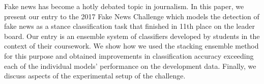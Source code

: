 Fake news has become a hotly debated topic in journalism. In this paper, we present our entry to the 2017 Fake News Challenge which models the detection of fake news as a stance classification task that finished in 11th place on the leader board. Our entry is an ensemble system of classifiers developed by students in the context of their coursework.  We show how we used the stacking ensemble method for this purpose and obtained improvements in classification accuracy  exceeding each of the individual models' performance on the development data. Finally, we discuss aspects of the experimental setup of the challenge.

